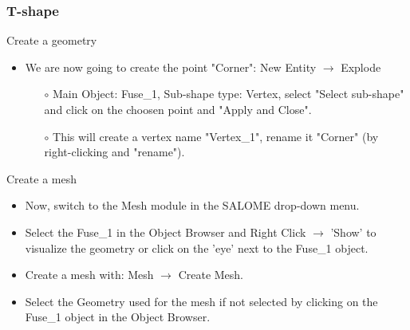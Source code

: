 \documentclass[10pt]{beamer}
\begin{document}
\begin{frame}
\frametitle{T-shape}

\begin{block}{Create a geometry}
\begin{itemize}
\item We are now going to create the point "Corner": New Entity $\rightarrow$ Explode \\
    \begin{itemize}
    \item [$\circ$] Main Object: Fuse\_1, Sub-shape type: Vertex, select "Select sub-shape" and click on the choosen point and "Apply and Close".
    \item [$\circ$] This will create a vertex name "Vertex\_1", rename it "Corner" (by right-clicking and "rename").
    \end{itemize}
\end{itemize}
\end{block}

\begin{block}{Create a mesh}
\begin{itemize}
\item \label{salome_mesh} Now, switch to the Mesh module in the SALOME drop-down menu.
\item Select the Fuse\_1 in the Object Browser and Right Click $\rightarrow$ 'Show' to visualize the geometry or click on the 'eye' next to the Fuse\_1 object.
\item Create a mesh with: Mesh $\rightarrow$ Create Mesh.
\item Select the Geometry used for the mesh if not selected by clicking on the Fuse\_1 object in the Object Browser.
\end{itemize}
\end{block}

\end{frame}
\end{document}
